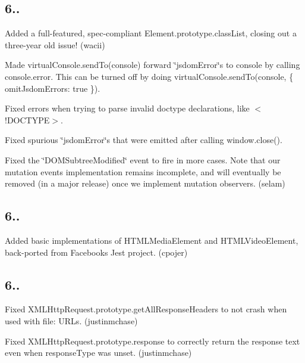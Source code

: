 \subsection*{6..}


\begin{DoxyItemize}
\item Added a full-\/featured, spec-\/compliant {\ttfamily Element.\+prototype.\+class\+List}, closing out a three-\/year old issue! (wacii)
\item Made {\ttfamily virtual\+Console.\+send\+To(console)} forward {\ttfamily \char`\"{}jsdom\+Error\char`\"{}}s to {\ttfamily console} by calling {\ttfamily console.\+error}. This can be turned off by doing {\ttfamily virtual\+Console.\+send\+To(console, \{ omit\+Jsdom\+Errors\+: true \})}.
\item Fixed errors when trying to parse invalid doctype declarations, like {\ttfamily $<$!\+D\+O\+C\+T\+Y\+PE$>$}.
\item Fixed spurious {\ttfamily \char`\"{}jsdom\+Error\char`\"{}}s that were emitted after calling {\ttfamily window.\+close()}.
\item Fixed the {\ttfamily \char`\"{}\+D\+O\+M\+Subtree\+Modified\char`\"{}} event to fire in more cases. Note that our mutation events implementation remains incomplete, and will eventually be removed (in a major release) once we implement mutation observers. (selam)
\end{DoxyItemize}

\subsection*{6..}


\begin{DoxyItemize}
\item Added basic implementations of {\ttfamily H\+T\+M\+L\+Media\+Element} and {\ttfamily H\+T\+M\+L\+Video\+Element}, back-\/ported from Facebook\textquotesingle{}s Jest project. (cpojer)
\end{DoxyItemize}

\subsection*{6..}


\begin{DoxyItemize}
\item Fixed {\ttfamily X\+M\+L\+Http\+Request.\+prototype.\+get\+All\+Response\+Headers} to not crash when used with {\ttfamily file\+:} U\+R\+Ls. (justinmchase)
\item Fixed {\ttfamily X\+M\+L\+Http\+Request.\+prototype.\+response} to correctly return the response text even when {\ttfamily response\+Type} was unset. (justinmchase)
\end{DoxyItemize}

